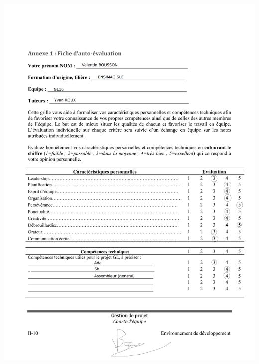 \documentclass[11pt]{article}
\begin{document}
\includegraphics[scale=0.2]{auto-eval_Valentin.png}
\newpage
\end{document}
